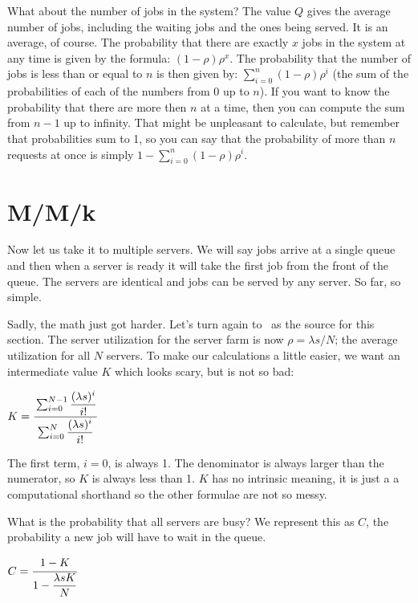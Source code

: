What about the number of jobs in the system? The value $Q$ gives the average number of jobs, including the waiting jobs and the ones being served. It is an average, of course. The probability that there are exactly $x$ jobs in the system at any time is given by the formula: $(1-\rho)\rho^{x}$. The probability that the number of jobs is less than or equal to $n$ is then given by: $\sum\limits_{i=0}^{n}(1-\rho)\rho^{i}$ (the sum of the probabilities of each of the numbers from 0 up to $n$). If you want to know the probability that there are more then $n$ at a time, then you can compute the sum from $n-1$ up to infinity. That might be unpleasant to calculate, but remember that probabilities sum to 1, so you can say that the probability of more than $n$ requests at once is simply $1 - \sum\limits_{i=0}^{n}(1-\rho)\rho^{i}$.

\section*{M/M/k}

Now let us take it to multiple servers. We will say jobs arrive at a single queue and then when a server is ready it will take the first job from the front of the queue. The servers are identical and jobs can be served by any server. So far, so simple.

Sadly, the math just got harder. Let's turn again to~\cite{williams-q} as the source for this section. The server utilization for the server farm is now $\rho = \lambda s / N$; the average utilization for all $N$ servers. To make our calculations a little easier, we want an intermediate value $K$ which looks scary, but is not so bad:

\begin{center}
	$K = \cfrac{\sum_{i=0}^{N-1}\dfrac{(\lambda s)^{i}}{i!}}{{\sum_{i=0}^{N}\dfrac{(\lambda s)^{i}}{i!}}}$
\end{center}

The first term, $i = 0$, is always 1. The denominator is always larger than the numerator, so $K$ is always less than 1. $K$ has no intrinsic meaning, it is just a a computational shorthand so the other formulae are not so messy.

What is the probability that all servers are busy? We represent this as $C$, the probability a new job will have to wait in the queue.

\begin{center}
	$C = \cfrac{1 - K}{1 - \dfrac{\lambda s K}{N}}$
\end{center}

